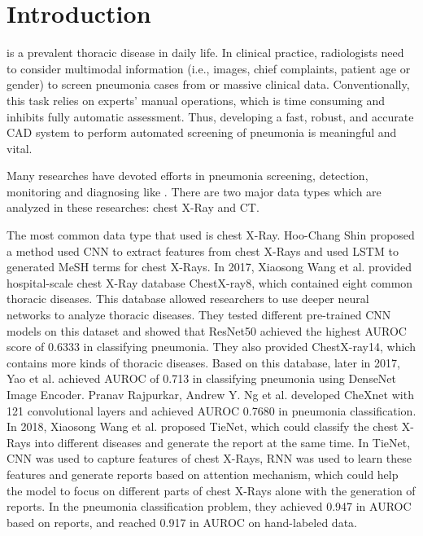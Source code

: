 \documentclass[journal]{IEEEtran}
\begin{document}
%
\IEEEpeerreviewmaketitle

\newpage
\section{Introduction}
\label{introduction}
 is a prevalent thoracic disease in daily life. 
In clinical practice, radiologists need to consider multimodal information (i.e., images, chief complaints, patient age or gender) to screen pneumonia cases from or massive clinical data. 
Conventionally, this task relies on experts’ manual operations, which is time consuming and inhibits fully automatic assessment. Thus, developing a fast, robust, and accurate CAD system to perform automated screening of pneumonia is meaningful and vital. 

Many researches have devoted efforts in pneumonia screening, detection, monitoring and diagnosing like \cite{Shin2016Learning, deepika2018classification, iakovidis2012image, hochreiter1997long, Wang2018TieNet}. There are two major data types which are analyzed in these researches: chest X-Ray and CT.

The most common data type that used is chest X-Ray. Hoo-Chang Shin \cite{Shin2016Learning} proposed a method used CNN to extract features from chest X-Rays and used LSTM \cite{hochreiter1997long} to generated MeSH \cite{timmurphy.org} terms for chest X-Rays. In 2017, Xiaosong Wang et al. \cite{Wang2017ChestX} provided hospital-scale chest X-Ray database ChestX-ray8, which contained eight common thoracic diseases. This database allowed researchers to use deeper neural networks to analyze thoracic diseases. They tested different pre-trained CNN models on this dataset and showed that ResNet50 achieved the highest AUROC score of 0.6333 in classifying pneumonia. They also provided ChestX-ray14, which contains more kinds of thoracic diseases.
Based on this database, later in 2017, Yao et al. \cite{yao2017learning} achieved AUROC of 0.713 in classifying pneumonia using DenseNet Image Encoder. Pranav Rajpurkar, Andrew Y. Ng et al. \cite{Rajpurkar2017CheXNet} developed CheXnet with 121 convolutional layers and achieved AUROC 0.7680 in pneumonia classification. 
In 2018, Xiaosong Wang et al. \cite{Wang2018TieNet} proposed TieNet, which could classify the chest X-Rays into different diseases and generate the report at the same time. In TieNet, CNN was used to capture features of chest X-Rays, RNN was used to learn these features and generate reports based on attention mechanism, which could help the model to focus on different parts of chest X-Rays alone with the generation of reports. In the pneumonia classification problem, they achieved 0.947 in AUROC based on reports, and reached 0.917 in AUROC on hand-labeled data. 
\end{document}
